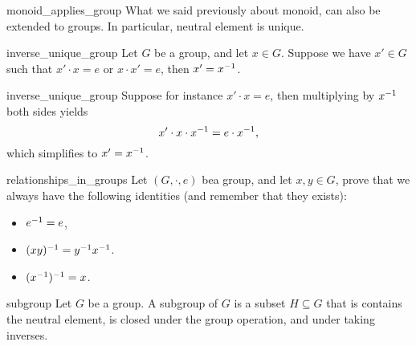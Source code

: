 \begin{crem}{}{monoid_applies_group}
    What we said previously about monoid, can also be extended to groups. In particular, neutral element is unique.
\end{crem}

\begin{clem}{}{inverse_unique_group}
    Let \( G \) be a group, and let \( x \in G \). Suppose we have \( x' \in G \) such that \( x' \cdot x = e \) or \( x \cdot x' = e \), then \( x' = x^{-1} \).
\end{clem}
\begin{lemproof}{inverse_unique_group}
    Suppose for instance \( x' \cdot x = e \), then multiplying by \( x^{-1} \) both sides yields
    \begin{equation*}
        x' \cdot x \cdot x^{-1} = e \cdot x^{-1},
    \end{equation*}
    which simplifies to \( x' = x^{-1} \). 
\end{lemproof}

\begin{cex}{}{relationships_in_groups}
    Let \( (G, \cdot, e) \) bea group, and let \( x, y \in G \), prove that we always have the following identities (and remember that they exists):
    \begin{itemize}
        \item \( e^{-1} = e \),
        \item \( (xy)^{-1} = y^{-1} x^{-1} \).
        \item \( (x^{-1})^{-1} = x \).
    \end{itemize} 
\end{cex}

\begin{cdef}{}{subgroup}
    Let \( G \) be a group. A subgroup of \( G \) is a subset \( H \subseteq G \) that is contains the neutral element, is closed under the group operation, and under taking inverses.
\end{cdef}

